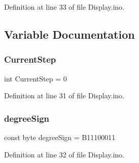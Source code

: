 Definition at line 33 of file Display.\+ino.



\subsection{Variable Documentation}
\mbox{\label{_display_8ino_abed21f2cc15579508af7dd150962b897}} 
\subsubsection{\texorpdfstring{CurrentStep}{CurrentStep}}
{\footnotesize\ttfamily int Current\+Step = 0}



Definition at line 31 of file Display.\+ino.

\mbox{\label{_display_8ino_a52bbda9914dc743d68aa085b872e9627}} 
\subsubsection{\texorpdfstring{degreeSign}{degreeSign}}
{\footnotesize\ttfamily const byte degree\+Sign = B11100011}



Definition at line 32 of file Display.\+ino.


